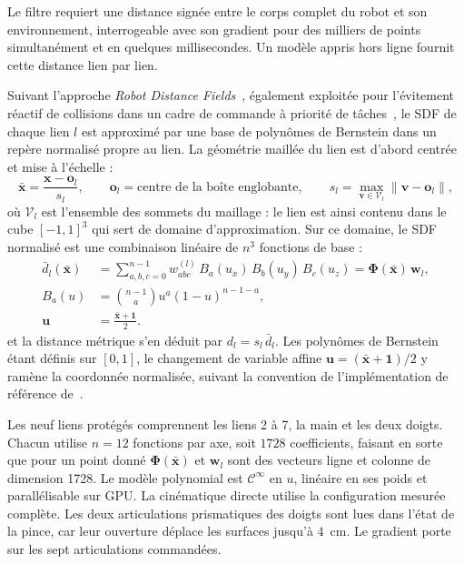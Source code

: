 Le filtre requiert une distance signée entre le corps complet du robot et son environnement, interrogeable avec son gradient pour des milliers de points simultanément et en quelques millisecondes. Un modèle appris hors ligne fournit cette distance lien par lien.

Suivant l'approche \textit{Robot Distance Fields}~\cite{Li2024rdf}, également exploitée pour l'évitement réactif de collisions dans un cadre de commande à priorité de tâches~\cite{Govoni2026rdf}, le \ac{SDF} de chaque lien $l$ est approximé par une base de polynômes de Bernstein dans un repère normalisé propre au lien. La géométrie maillée du lien est d'abord centrée et mise à l'échelle :
\begin{equation}\label{eq:norm_dataset_SDF}
  \bar{\mathbf{x}} = \frac{\mathbf{x}-\mathbf{o}_l}{s_l},
\qquad
\mathbf{o}_l = \text{centre de la boîte englobante},
\qquad
s_l = \max_{\mathbf{v}\in\mathcal{V}_l}\|\mathbf{v}-\mathbf{o}_l\|,
\end{equation}
où $\mathcal{V}_l$ est l'ensemble des sommets du maillage : le lien est ainsi contenu dans le cube $[-1,1]^3$ qui sert de domaine d'approximation. Sur ce domaine, le \ac{SDF} normalisé est une combinaison linéaire de $n^3$ fonctions de base :
\begin{equation}\label{eq:sdf_bernstein}
    \begin{aligned}
    \bar{d}_l(\bar{\mathbf{x}}) &= \sum_{a,b,c=0}^{n-1} w^{(l)}_{abc}\, B_a(u_x)\,B_b(u_y)\,B_c(u_z) = \boldsymbol{\Phi}(\bar{\mathbf{x}})\,
  \mathbf{w}_l, \\
    B_a(u) &= \binom{n-1}{a} u^a (1-u)^{n-1-a}, \\
    \mathbf{u} &= \frac{\bar{\mathbf{x}}+\mathbf{1}}{2}.
    \end{aligned}
\end{equation}
et la distance métrique s'en déduit par $d_l = s_l\,\bar{d}_l$. Les polynômes de Bernstein étant définis sur $[0,1]$, le changement de variable affine $\mathbf{u}=(\bar{\mathbf{x}}+\mathbf{1})/2$ y ramène la coordonnée normalisée, suivant la convention de l'implémentation de référence de~\cite{Li2024rdf}.

Les neuf liens protégés comprennent les liens 2 à 7, la main et les deux doigts. Chacun utilise $n=12$ fonctions par axe, soit $1728$ coefficients, faisant en sorte que pour un point donné $\boldsymbol{\Phi}(\bar{\mathbf{x}})$ et $\mathbf{w}_l$ sont des vecteurs ligne et colonne de dimension 1728. Le modèle polynomial est $\mathcal{C}^\infty$ en $u$, linéaire en ses poids et parallélisable sur \ac{GPU}. La cinématique directe utilise la configuration mesurée complète. Les deux articulations prismatiques des doigts sont lues dans l'état de la pince, car leur ouverture déplace les surfaces jusqu'à $4$~cm. Le gradient porte sur les sept articulations commandées.

